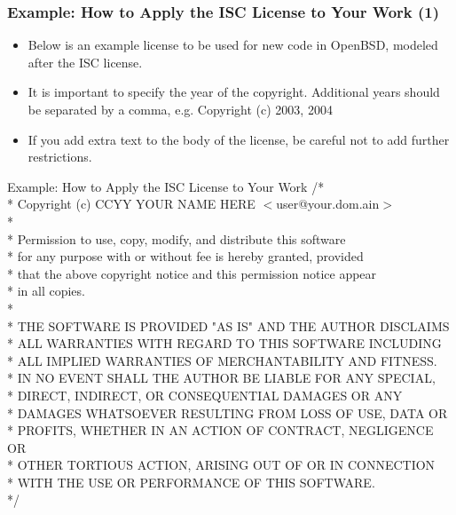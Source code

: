 \documentclass{beamer}
\begin{document}

\begin{frame}
\frametitle{Example: How to Apply the ISC License to Your Work (1)}

\begin{itemize}
\item Below is an example license to be used for new code in OpenBSD,
modeled after the ISC license.
\item It is important to specify the year of the copyright.  Additional years
should be separated by a comma, e.g.
    Copyright (c) 2003, 2004
\item If you add extra text to the body of the license, be careful not to
add further restrictions.
\end{itemize}

\end{frame}


\begin{frame}

\begin{block}{Example: How to Apply the ISC License to Your Work}
\footnotesize
/* \\
 * Copyright (c) CCYY YOUR NAME HERE $<$user@your.dom.ain$>$ \\
 * \\
 * Permission to use, copy, modify, and distribute this software \\
 * for any purpose with or without fee is hereby granted, provided \\
 * that the above copyright notice and this permission notice appear \\
 * in all copies. \\
 * \\
 * THE SOFTWARE IS PROVIDED "AS IS" AND THE AUTHOR DISCLAIMS \\
 * ALL WARRANTIES WITH REGARD TO THIS SOFTWARE INCLUDING \\
 * ALL IMPLIED WARRANTIES OF MERCHANTABILITY AND FITNESS. \\
 * IN NO EVENT SHALL THE AUTHOR BE LIABLE FOR ANY SPECIAL, \\
 * DIRECT, INDIRECT, OR CONSEQUENTIAL DAMAGES OR ANY \\
 * DAMAGES WHATSOEVER RESULTING FROM LOSS OF USE, DATA OR \\
 * PROFITS, WHETHER IN AN ACTION OF CONTRACT, NEGLIGENCE OR \\
 * OTHER TORTIOUS ACTION, ARISING OUT OF OR IN CONNECTION \\
 * WITH THE USE OR PERFORMANCE OF THIS SOFTWARE. \\
 */
\end{block}

\end{frame}
\end{document}
